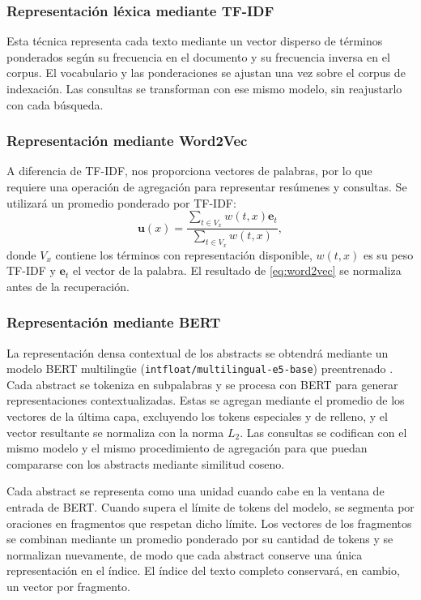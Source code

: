 \documentclass[conference]{IEEEtran}
\begin{document}
\subsubsection{Representación léxica mediante TF-IDF}

Esta técnica representa cada texto mediante un vector disperso de términos ponderados según su frecuencia en el documento y su frecuencia inversa en el corpus. El vocabulario y las ponderaciones se ajustan una vez sobre el corpus de indexación. Las consultas se transforman con ese mismo modelo, sin reajustarlo con cada búsqueda.

\subsubsection{Representación mediante Word2Vec}

A diferencia de TF-IDF, nos proporciona vectores de palabras, por lo que requiere una operación de agregación para representar resúmenes y consultas. Se utilizará un promedio ponderado por TF-IDF:
\begin{equation}
 \mathbf{u}(x)=
 \frac{\sum_{t\in V_x}w(t,x)\mathbf{e}_t}
 {\sum_{t\in V_x}w(t,x)},
 \label{eq:word2vec}
\end{equation}
donde $V_x$ contiene los términos con representación disponible, $w(t,x)$ es su peso TF-IDF y $\mathbf{e}_t$ el vector de la palabra. El resultado de \eqref{eq:word2vec} se normaliza antes de la recuperación.

\subsubsection{Representación mediante BERT}

La representación densa contextual de los abstracts se obtendrá mediante un modelo BERT multilingüe (\texttt{intfloat/multilingual-e5-base}) preentrenado \cite{wang2024}. Cada abstract se tokeniza en subpalabras y se procesa con BERT para generar representaciones contextualizadas. Estas se agregan mediante el promedio de los vectores de la última capa, excluyendo los tokens especiales y de relleno, y el vector resultante se normaliza con la norma $L_2$. Las consultas se codifican con el mismo modelo y el mismo procedimiento de agregación para que puedan compararse con los abstracts mediante similitud coseno.

Cada abstract se representa como una unidad cuando cabe en la ventana de entrada de BERT. Cuando supera el límite de tokens del modelo, se segmenta por oraciones en fragmentos que respetan dicho límite. Los vectores de los fragmentos se combinan mediante un promedio ponderado por su cantidad de tokens y se normalizan nuevamente, de modo que cada abstract conserve una única representación en el índice. El índice del texto completo conservará, en cambio, un vector por fragmento.
\end{document}
